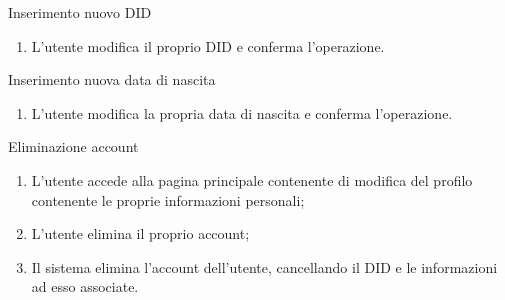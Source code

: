 \begin{usecase}{10.3}{Inserimento nuovo DID}\label{uc:modifica-did}
  \usecasemain{}
  
  \begin{enumerate}
    \item L'utente modifica il proprio DID e conferma l'operazione.
  \end{enumerate}
  
\end{usecase}

\begin{usecase}{10.4}{Inserimento nuova data di nascita}\label{uc:modifica-data-nascita}
  \usecasemain{}
  
  \begin{enumerate}
    \item L'utente modifica la propria data di nascita e conferma l'operazione.
  \end{enumerate}
  
\end{usecase}

\begin{usecase}{11}{Eliminazione account}\label{uc:eliminazione-account}
  \usecasemain{}
  
  \begin{enumerate}
    \item L'utente accede alla pagina principale contenente di modifica del profilo contenente le proprie informazioni personali;
    \item L'utente elimina il proprio account;
    \item Il sistema elimina l'account dell'utente, cancellando il DID e le informazioni ad esso associate.
  \end{enumerate}
\end{usecase}

